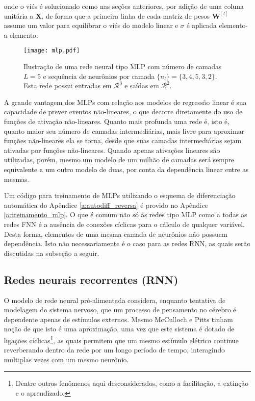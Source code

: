    \noindent onde o viés é solucionado como nas seções anteriores, por adição de uma coluna unitária a $\boldsymbol{X}$, de forma que a primeira linha de cada matriz de pesos $\boldsymbol{W}^{[l]}$ assume um valor para equilibrar o viés do modelo linear e $\sigma$ é aplicada elemento-a-elemento.

    \begin{figure}
      \begin{center}
        \texttt{[image: mlp.pdf]}
      \end{center}
      \caption{Ilustração de uma rede neural tipo MLP com número de camadas $L=5$ e sequência de neurônios por camada $\{n_l\} = \{3,4,5,3,2\}$. Esta rede possui entradas em $\mathcal{R}^{3}$ e saídas em $\mathcal{R}^{2}$.}
      \label{f:mlp}
    \end{figure}

    A grande vantagem dos MLPs com relação aos modelos de regressão linear é sua capacidade de prever eventos não-lineares, o que decorre diretamente do uso de funções de ativação não-lineares. Quanto mais profunda uma rede é, isto é, quanto maior seu número de camadas intermediárias, mais livre para aproximar funções não-lineares ela se torna, desde que suas camadas intermediárias sejam ativadas por funções não-lineares. Quando apenas ativações lineares são utilizadas, porém, mesmo um modelo de um milhão de camadas será sempre equivalente a um outro modelo de duas, por conta da dependência linear entre as mesmas.

    Um código para treinamento de MLPs utilizando o esquema de diferenciação automática do Apêndice \ref{a:autodiff_reversa} é provido no Apêndice \ref{a:treinamento_mlp}. O que é comum não só às redes tipo MLP como a todas as redes FNN é a ausência de conexões cíclicas para o cálculo de qualquer variável. Desta forma, elementos de uma mesma camada de neurônios não possuem dependência. Isto não necessariamente é o caso para as redes RNN, as quais serão discutidas na subseção a seguir.

    \subsection{Redes neurais recorrentes (RNN)} \label{s:rnn}

      O modelo de rede neural pré-alimentada considera, enquanto tentativa de modelagem do sistema nervoso, que um processo de pensamento no cérebro é dependente apenas de estímulos externos. Mesmo McCulloch e Pitts \citeyear{mcculloch1943logical} tinham noção de que isto é uma aproximação, uma vez que este sistema é dotado de ligações cíclicas\footnote{Dentre outros fenômenos aqui desconsiderados, como a facilitação, a extinção e o aprendizado.}, as quais permitem que um mesmo estímulo elétrico continue reverberando dentro da rede por um longo período de tempo, interagindo multiplas vezes com um mesmo neurônio.

